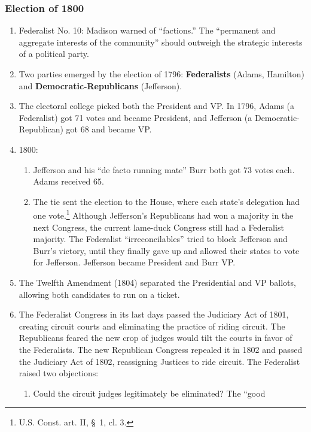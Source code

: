 \begin{enumerate}
\subsubsection{Election of 1800}

\begin{enumerate}
    \item Federalist No. 10: Madison warned of ``factions.'' The ``permanent 
    and aggregate interests of the community'' should outweigh the strategic 
    interests of a political party.
    \item Two parties emerged by the election of 1796: \textbf{Federalists} 
    (Adams, Hamilton) and \textbf{Democratic-Republicans} (Jefferson).
    \item The electoral college picked both the President and VP. In 1796, 
    Adams (a Federalist) got 71 votes and became President, and Jefferson (a 
    Democratic-Republican) got 68 and became VP.
    \item 1800:
    \begin{enumerate}
        \item Jefferson and his ``de facto running mate'' Burr both got 73 
        votes each. Adams received 65.
        \item The tie sent the election to the House, where each state's 
        delegation had one vote.\footnote{U.S. Const. art. II, \S\ 1, cl. 3.} 
        Although Jefferson's Republicans had won a majority in the next 
        Congress, the current lame-duck Congress still had a Federalist 
        majority. The Federalist ``irreconcilables'' tried to block Jefferson 
        and Burr's victory, until they finally gave up and allowed their 
        states to vote for Jefferson. Jefferson became President and Burr VP.
    \end{enumerate}
    \item The Twelfth Amendment (1804) separated the Presidential and VP 
    ballots, allowing both candidates to run on a ticket.
    \item The Federalist Congress in its last days passed the Judiciary Act of 
    1801, creating circuit courts and eliminating the practice of riding 
    circuit. The Republicans feared the new crop of judges would tilt the 
    courts in favor of the Federalists. The new Republican Congress repealed 
    it in 1802 and passed the Judiciary Act of 1802, reassigning Justices to 
    ride circuit. The Federalist raised two 
    objections:
    \begin{enumerate}
        \item Could the circuit judges legitimately be eliminated? The ``good 

\end{enumerate}
\end{enumerate}
\end{enumerate}
